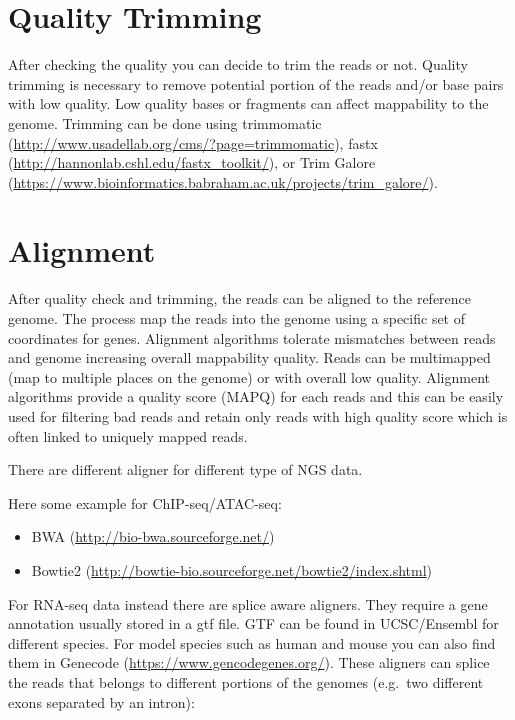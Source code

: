 \documentclass[]{book}
\begin{document}
\hypertarget{quality-trimming}{%
\section{Quality Trimming}\label{quality-trimming}}

After checking the quality you can decide to trim the reads or not.
Quality trimming is necessary to remove potential portion of the reads and/or base pairs with low quality. Low quality bases or fragments can affect mappability to the genome.
Trimming can be done using trimmomatic (\url{http://www.usadellab.org/cms/?page=trimmomatic}), fastx (\url{http://hannonlab.cshl.edu/fastx_toolkit/}), or Trim Galore (\url{https://www.bioinformatics.babraham.ac.uk/projects/trim_galore/}).

\hypertarget{alignment}{%
\section{Alignment}\label{alignment}}

After quality check and trimming, the reads can be aligned to the reference genome. The process map the reads into the genome using a specific set of coordinates for genes. Alignment algorithms tolerate mismatches between reads and genome increasing overall mappability quality. Reads can be multimapped (map to multiple places on the genome) or with overall low quality. Alignment algorithms provide a quality score (MAPQ) for each reads and this can be easily used for filtering bad reads and retain only reads with high quality score which is often linked to uniquely mapped reads.

There are different aligner for different type of NGS data.

Here some example for ChIP-seq/ATAC-seq:

\begin{itemize}
\item
  BWA (\url{http://bio-bwa.sourceforge.net/})
\item
  Bowtie2 (\url{http://bowtie-bio.sourceforge.net/bowtie2/index.shtml})
\end{itemize}

For RNA-seq data instead there are splice aware aligners. They require a gene annotation usually stored in a gtf file. GTF can be found in UCSC/Ensembl for different species. For model species such as human and mouse you can also find them in Genecode (\url{https://www.gencodegenes.org/}). These aligners can splice the reads that belongs to different portions of the genomes (e.g.~two different exons separated by an intron):
\end{document}

